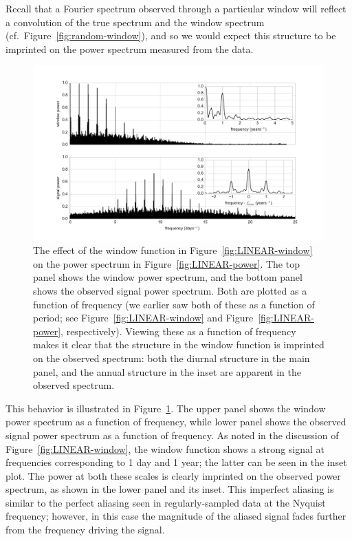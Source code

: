 \documentclass[preprint]{aastex}
\newcommand{\fig}[1]{Figure~\ref{fig:#1}}
\newcommand{\figlabel}[1]{\label{fig:#1}}
\begin{document}
Recall that a Fourier spectrum observed through a particular window will reflect
a convolution of the true spectrum and the window spectrum
(cf.\ \fig{random-window}), and so we would expect this structure to be
imprinted on the power spectrum measured from the data.


\begin{figure}[ht]
  \centering
  \includegraphics[width=\textwidth]{fig15_LINEAR_window_effect}
  \caption{The effect of the window function in \fig{LINEAR-window} on the
    power spectrum in \fig{LINEAR-power}.
    The top panel shows the window power spectrum, and the bottom panel shows
    the observed signal power spectrum.
    Both are plotted as a function of frequency (we earlier saw both of these
    as a function of period; see \fig{LINEAR-window} and \fig{LINEAR-power},
    respectively).
    Viewing these as a function of frequency makes it clear that the structure
    in the window function is imprinted on the observed spectrum: both the
    diurnal structure in the main panel, and the annual structure in the inset
    are apparent in the observed spectrum.
    \figlabel{LINEAR-window-effect}}
\end{figure}

This behavior is illustrated in \fig{LINEAR-window-effect}.
The upper panel shows the window power spectrum as a function of frequency, while lower panel shows the observed signal power spectrum as a function of frequency.
As noted in the discussion of \fig{LINEAR-window}, the window function shows a strong signal at frequencies corresponding to 1 day and 1 year; the latter can be seen in the inset plot.
The power at both these scales is clearly imprinted on the observed power spectrum, as shown in the lower panel and its inset.
This imperfect aliasing is similar to the perfect aliasing seen in regularly-sampled data at the Nyquist frequency; however, in this case the magnitude of the
aliased signal fades further from the frequency driving the signal.
\end{document}
